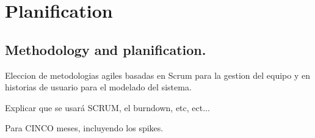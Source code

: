 \chapter{Planification}
\section{Methodology and planification.}

Eleccion de metodologias agiles basadas en Scrum para la gestion del
equipo y en historias de usuario para el modelado del sistema.

Explicar que se usará SCRUM, el burndown, etc, ect...

Para CINCO meses, incluyendo los spikes.
